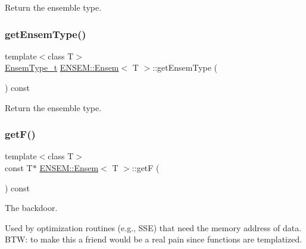 Return the ensemble type. 

\mbox{\label{classENSEM_1_1Ensem_aa2cfc665852c06f9b058a1a2233d249e}} 
\subsubsection{\texorpdfstring{getEnsemType()}{getEnsemType()}\hspace{0.1cm}{\footnotesize\ttfamily [2/2]}}
{\footnotesize\ttfamily template$<$class T$>$ \\
\mbox{\hyperlink{namespaceENSEM_a2dc2c4a26884f343471e52f23479ddbe}{Ensem\+Type\+\_\+t}} \mbox{\hyperlink{classENSEM_1_1Ensem}{E\+N\+S\+E\+M\+::\+Ensem}}$<$ T $>$\+::get\+Ensem\+Type (\begin{DoxyParamCaption}{ }\end{DoxyParamCaption}) const\hspace{0.3cm}{\ttfamily [inline]}}



Return the ensemble type. 

\mbox{\label{classENSEM_1_1Ensem_ad2cb7a34934bedeaa29f49c78cdb8371}} 
\subsubsection{\texorpdfstring{getF()}{getF()}\hspace{0.1cm}{\footnotesize\ttfamily [1/4]}}
{\footnotesize\ttfamily template$<$class T$>$ \\
const T$\ast$ \mbox{\hyperlink{classENSEM_1_1Ensem}{E\+N\+S\+E\+M\+::\+Ensem}}$<$ T $>$\+::getF (\begin{DoxyParamCaption}{ }\end{DoxyParamCaption}) const\hspace{0.3cm}{\ttfamily [inline]}}



The backdoor. 

Used by optimization routines (e.\+g., S\+SE) that need the memory address of data. B\+TW\+: to make this a friend would be a real pain since functions are templatized. \mbox{\label{classENSEM_1_1Ensem_ad2cb7a34934bedeaa29f49c78cdb8371}} 
